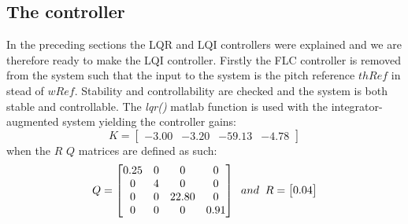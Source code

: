 \subsection{The controller} \label{sec:ctrl_thecontroller}
In the preceding sections the LQR and LQI controllers were explained and we are therefore ready to make the LQI controller. Firstly the FLC controller is removed from the system such that the input to the system is the pitch reference $ thRef $ in stead of $ wRef $. Stability and controllability are checked and the system is both stable and controllable. The \textit{lqr()} matlab function is used with the integrator-augmented system yielding the controller gains:
\begin{equation}\label{eq:lqi_K}
	K = \begin{bmatrix} -3.00 & -3.20 & -59.13 & -4.78 \end{bmatrix}
\end{equation}
when the $ R $  $ Q $ matrices are defined as such:
\begin{equation}\label{eq:lqi_Q_and_R}
	Q =   \begin{bmatrix}
		0.25 &  0 &  0 &  0 \cr
		0 &  4 &  0 &  0 \cr
		0 &  0 & 22.80 &  0 \cr
		0 &  0 &  0 &  0.91
	\end{bmatrix} \;\; and \;\; 
	R = \begin{bmatrix} 0.04 \end{bmatrix}
\end{equation}